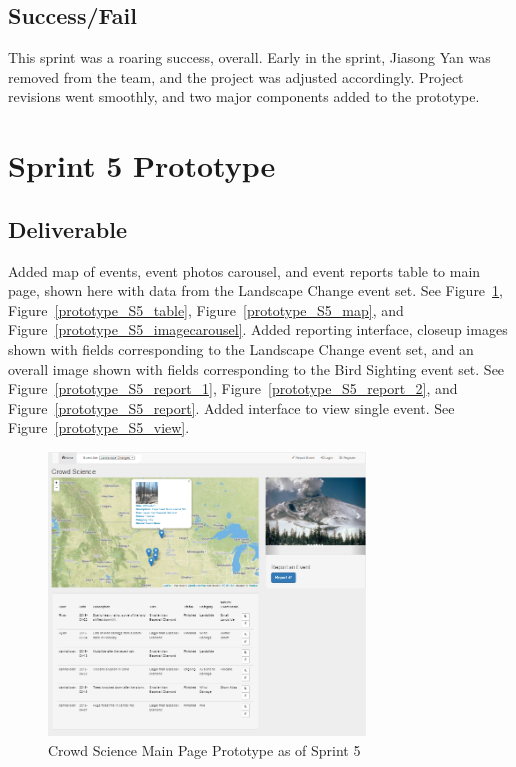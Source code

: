 \subsection{Success/Fail}
This sprint was a roaring success, overall. Early in the sprint, Jiasong Yan was removed from the team, and the project was adjusted accordingly. Project revisions went smoothly, and two major components added to the prototype.

\section{Sprint 5 Prototype}
\subsection{Deliverable}
Added map of events, event photos carousel, and event reports table to main page, shown here with data from the Landscape Change event set. See Figure~\ref{prototype_S5_main}, Figure~\ref{prototype_S5_table},  Figure~\ref{prototype_S5_map}, and  Figure~\ref{prototype_S5_imagecarousel}.  Added reporting interface, closeup images shown with fields corresponding to the Landscape Change event set, and an overall image shown with fields corresponding to the Bird Sighting event set. See Figure~\ref{prototype_S5_report_1}, Figure~\ref{prototype_S5_report_2}, and Figure~\ref{prototype_S5_report}. Added interface to view single event. See Figure~\ref{prototype_S5_view}.

\begin{figure}[tbh]
\begin{center}
\includegraphics[width=0.75\textwidth]{./figures/prototype_S5_main.png}
\end{center}
\caption{Crowd Science Main Page Prototype as of Sprint 5\label{prototype_S5_main}}
\end{figure}

